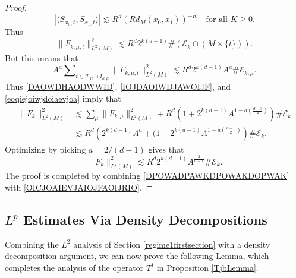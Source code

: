 \begin{proof}
%
\begin{equation}
    |\langle {S\!}_{x_0,t}, {S\!}_{x_1,t} \rangle| \lesssim R^d ( R d_M(x_0,x_1) )^{-K} \quad\text{for all $K \geq 0$}.
\end{equation}
%
Thus
%
\begin{equation}
    \| F_{k,\mu,t} \|_{L^2(M)}^2 \lesssim R^{d} 2^{k(d-1)} \# (\mathcal{E}_k \cap (M \times \{ t \})).
\end{equation}
%
But this means that
%
\begin{equation} \label{eoqiejoiwjdoiaevjoa}
    A^a \sum\nolimits_{t \in \mathcal{T}_R \cap I_{k,\mu}} \| F_{k,\mu,t} \|_{L^2(M)}^2 \lesssim R^{d} 2^{k(d-1)} A^a \# \mathcal{E}_{k,\mu}.
\end{equation}
%
Thus \eqref{DAOWDHAODWWID}, \eqref{IOJDAOIWDJAWOIJF}, and \eqref{eoqiejoiwjdoiaevjoa} imply that
%
\begin{equation}
\begin{split}
    \| F_k \|_{L^2(M)}^2 &\lesssim \sum\nolimits_\mu \| F_{k,\mu} \|_{L^2(M)}^2 + R^{d} \left( 1 + 2^{k(d-1)} A^{1 - a \left( \frac{d-3}{2} \right)} \right) \# \mathcal{E}_k\\
    &\lesssim R^{d} \left( 2^{k(d-1)} A^a + (1 + 2^{k(d-1)} A^{1 - a \left( \frac{d-3}{2} \right)} \right) \# \mathcal{E}_k.
\end{split}
\end{equation}
%
Optimizing by picking $a = 2 / (d-1)$ gives that
%
\begin{equation} \label{OICJOAIEVJAIOJFAOIJRIO}
    \| F_k \|_{L^2(M)}^2 \lesssim R^{d} 2^{k(d-1)} A^{\frac{2}{d-1}} \# \mathcal{E}_k.
\end{equation}
%
The proof is completed by combining \eqref{DPOWADPAWKDPOWAKDOPWAK} with \eqref{OICJOAIEVJAIOJFAOIJRIO}.
\end{proof}






\subsection{\boldmath $L^p$ Estimates Via Density Decompositions} \label{regime1densitydecomposition}

Combining the $L^2$ analysis of Section \ref{regime1firstsection} with a density decomposition argument, we can now prove the following Lemma, which completes the analysis of the operator $T^I$ in Proposition \ref{TjbLemma}.

